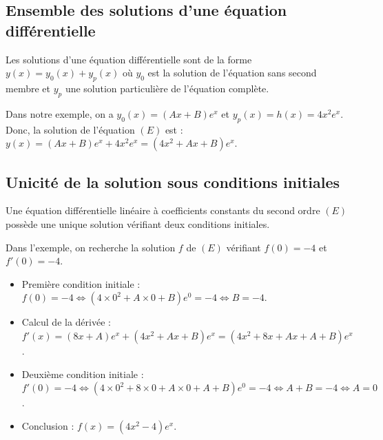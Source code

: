 \documentclass[french]{book}
\begin{document}
\subsection{Ensemble des solutions d'une équation différentielle}

\begin{thm}
Les solutions d'une équation différentielle sont de la forme $y(x)=y_0(x)+y_p(x)$ où $y_0$ est la solution de l'équation sans second membre et $y_p$ une solution particulière de l'équation complète.
\end{thm}

\begin{exemple}
Dans notre exemple, on a $y_0(x) =(Ax+B)e^x$ et $y_p(x)=h(x)=4x^2e^x$. \\
Donc, la solution de l'équation $(E)$ est : $y(x) =(Ax+B)e^x+4x^2e^x =(4x^2+Ax+B)e^x$.
\end{exemple}


\subsection{Unicité de la solution sous conditions initiales}

\begin{thm}
Une équation différentielle linéaire à coefficients constants du second ordre $(E)$ possède une unique solution vérifiant deux conditions initiales.
\end{thm}

\begin{exemple}
Dans l'exemple, on recherche la solution $f$ de $(E)$ vérifiant $f(0) =-4$ et $f'(0) =-4$.
\begin{itemize}
   \item Première condition initiale : \\
   \hspace*{0.3cm} $f(0) =-4 \Longleftrightarrow (4\times0^2+A\times0+B)e^0 =-4 \Longleftrightarrow B =-4$.
   \item Calcul de la dérivée : \\
   \hspace*{0.3cm} $f'(x) =(8x+A)e^x+(4x^2+Ax+B)e^x =(4x^2+8x+Ax+A+B)e^x$.
   \item Deuxième condition initiale : \\
   \hspace*{0.3cm} $f'(0) =-4 \Longleftrightarrow (4\times0^2+8\times0+A\times0+A+B)e^0 =-4 \Longleftrightarrow A+B =-4 \Longleftrightarrow A =0$.
   \item Conclusion : 
   \hspace*{0.3cm} $f(x) =(4x^2-4)e^x$.
\end{itemize}
\end{exemple}
\end{document}
